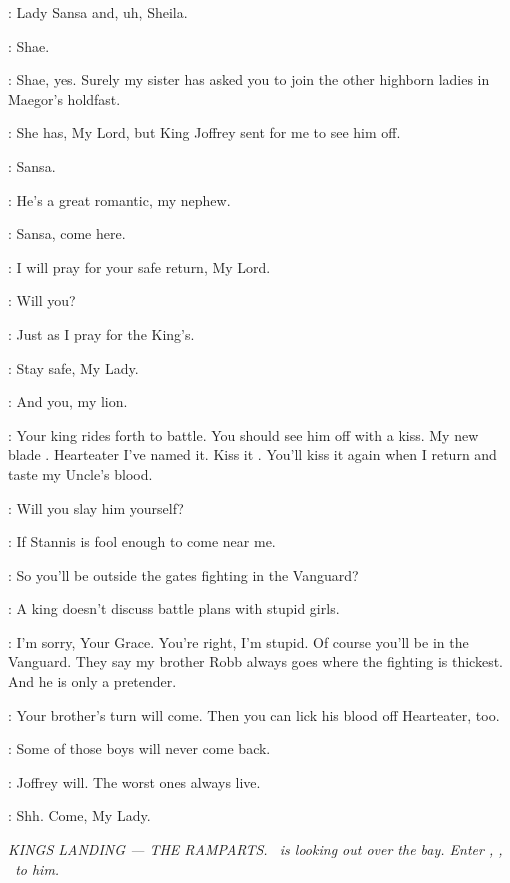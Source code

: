 \TYRION: Lady Sansa and, uh, Sheila. 

\SHAE: Shae. 

\TYRION: Shae, yes. Surely my sister has asked you to join the other highborn ladies in Maegor's holdfast. 

\SANSA: She has, My Lord, but King Joffrey sent for me to see him off. 

\JOFFREY:  Sansa. 

\TYRION: He's a great romantic, my nephew. 

\JOFFREY: Sansa, come here. 

\SANSA: I will pray for your safe return, My Lord. 

\TYRION: Will you? 

\SANSA: Just as I pray for the King's. 


\TYRION:  Stay safe, My Lady. 

\SHAE: And you, my lion. 

\JOFFREY: Your king rides forth to battle. You should see him off with
a kiss. My new blade . Hearteater I've named
it. Kiss it . You'll kiss it again when I return and
taste my Uncle's blood.

\SANSA: Will you slay him yourself? 

\JOFFREY: If Stannis is fool enough to come near me. 

\SANSA: So you'll be outside the gates fighting in the Vanguard? 

\JOFFREY: A king doesn't discuss battle plans with stupid girls. 

\SANSA: I'm sorry, Your Grace. You're right, I'm stupid. Of course you'll be in the Vanguard. They say my brother Robb always goes where the fighting is thickest. And he is only a pretender. 

\SANSA: Your brother's turn will come. Then you can lick his blood off Hearteater, too. 


\SHAE: Some of those boys will never come back. 

\SANSA: Joffrey will. The worst ones always live. 

\SHAE: Shh. Come, My Lady. 


\scene

\textit{KINGS LANDING --- THE RAMPARTS. \TYRION ~is looking out over
the bay. Enter \LANCEL, \JOFFREY, \HOUND ~to him.} 


